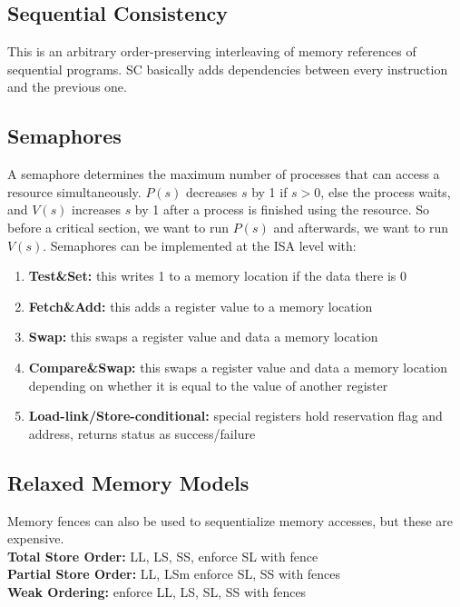 \documentclass{article}
\begin{document}
\subsection{Sequential Consistency}

This is an arbitrary order-preserving interleaving of memory references of sequential programs. SC basically adds dependencies between every instruction and the previous one.

\subsection{Semaphores}

A semaphore determines the maximum number of processes that can access a resource simultaneously. $P(s)$ decreases $s$ by 1 if $s > 0$, else the process waits, and $V(s)$ increases $s$ by 1 after a process is finished using the resource. So before a critical section, we want to run $P(s)$ and afterwards, we want to run $V(s)$. Semaphores can be implemented at the ISA level with:

\begin{enumerate}
\item \textbf{Test\&Set:} this writes 1 to a memory location if the data there is 0
\item \textbf{Fetch\&Add:} this adds a register value to a memory location
\item \textbf{Swap:} this swaps a register value and data a memory location
\item \textbf{Compare\&Swap:} this swaps a register value and data a memory location depending on whether it is equal to the value of another register
\item \textbf{Load-link/Store-conditional:} special registers hold reservation flag and address, returns status as success/failure
\end{enumerate}

\subsection{Relaxed Memory Models}

Memory fences can also be used to sequentialize memory accesses, but these are expensive. \\
\textbf{Total Store Order:} LL, LS, SS, enforce SL with fence \\
\textbf{Partial Store Order:} LL, LSm enforce SL, SS with fences \\
\textbf{Weak Ordering:} enforce LL, LS, SL, SS with fences
\end{document}
